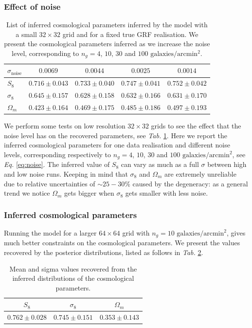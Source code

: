 \subsubsection{Effect of noise}
\begin{table}[h]
\centering
\caption{List of inferred cosmological parameters inferred by the model with a small $32\times32$ grid and for a fixed true GRF realisation. We present the cosmological parameters inferred as we increase the noise level, corresponding to $n_g = 4$, $10$, $30$ and $100 \text{ galaxies}/\text{arcmin}^2$.}\label{tab:inferred cosmological parameters}
\begin{tabular}{lcccc}
    \toprule
    $\sigma_\text{noise}$ & $0.0069$ & $0.0044$ & $0.0025$ & $0.0014$\\
    \midrule
    $S_8$      & $0.716\pm0.043$ & $0.733\pm0.040$ & $0.747\pm0.041$ & $0.752\pm0.042$\\
    $\sigma_8$ & $0.645\pm0.157$ & $0.628\pm0.158$ & $0.632\pm0.166$ & $0.631\pm0.170$\\
    $\Omega_m$ & $0.423\pm0.164$ & $0.469\pm0.175$ & $0.485\pm0.186$ & $0.497\pm0.193$\\
    \bottomrule
\end{tabular}
\end{table}
We perform some tests on low resolution $32\times32$ grids to see the effect that the noise level has on the recovered parameters, see \textit{Tab. }\ref{tab:inferred cosmological parameters}. Here we report the inferred cosmological parameters for one data realisation and different noise levels, corresponding respectively to $n_g = 4$, $10$, $30$ and $100 \text{ galaxies}/\text{arcmin}^2$, see \textit{Eq. }\eqref{eq:noise}. The inferred value of $S_8$ can vary as much as a full $\sigma$ between high and low noise runs. Keeping in mind that $\sigma_8$ and $\Omega_m$ are extremely unreliable due to relative uncertainties of $\sim 25-30\%$ caused by the degeneracy: as a general trend we notice $\Omega_m$ gets bigger when $\sigma_8$ gets smaller with less noise.

\subsubsection{Inferred cosmological parameters}
Running the model for a larger $64\times64$ grid with $n_g=10 \text{ galaxies}/\text{arcmin}^2$, gives much better constraints on the cosmological parameters. We present the values recovered by the posterior distributions, listed as follows in \textit{Tab. }\ref{tab:inferred cosmological parameters (64,64)}. 
\begin{table}[h]
    \centering
    \caption{\label{tab:inferred cosmological parameters (64,64)} Mean and sigma values recovered from the inferred distributions of the cosmological parameters.}
    \begin{tabular}{ccc}
        \toprule
        $S_8$ & $\sigma_8$ & $\Omega_m$\\
        \midrule
        $0.762\pm0.028$ & $0.745\pm0.151$ & $0.353\pm0.143$\\
        \bottomrule
    \end{tabular}
\end{table} 

